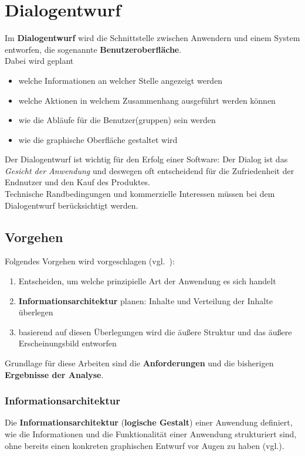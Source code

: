 \section{Dialogentwurf}
Im \textbf{Dialogentwurf} wird die Schnittstelle zwischen Anwendern und einem System entworfen, die sogenannte \textbf{Benutzeroberfläche}.\\

\noindent
Dabei wird geplant

\begin{itemize}
    \item welche Informationen an welcher Stelle angezeigt werden
    \item welche Aktionen in welchem Zusammenhang ausgeführt werden können
    \item wie die Abläufe für die Benutzer(gruppen) sein werden
    \item wie die graphische Oberfläche gestaltet wird
\end{itemize}

\noindent
Der Dialogentwurf ist wichtig für den Erfolg einer Software: Der Dialog ist das \textit{Gesicht der Anwendung} und deswegen oft entscheidend für die Zufriedenheit der Endnutzer und den Kauf des Produktes.\\

\noindent
Technische Randbedingungen und kommerzielle Interessen müssen bei dem Dialogentwurf berücksichtigt werden.


\subsection{Vorgehen}

Folgendes Vorgehen wird vorgeschlagen (vgl.~\cite[29]{Wed09b}):

\begin{enumerate}
    \item Entscheiden, um welche prinzipielle Art der Anwendung es sich handelt
    \item \textbf{Informationsarchitektur} planen: Inhalte und Verteilung der Inhalte überlegen
    \item basierend auf diesen Überlegungen wird die äußere Struktur und das äußere Erscheinungsbild entworfen
\end{enumerate}

\noindent
Grundlage für diese Arbeiten sind die \textbf{Anforderungen} und die bisherigen \textbf{Ergebnisse der Analyse}.

\subsubsection*{Informationsarchitektur}
Die \textbf{Informationsarchitektur} (\textbf{logische Gestalt}) einer Anwendung definiert, wie die Informationen und die Funktionalität einer Anwendung strukturiert sind, ohne bereits einen konkreten graphischen Entwurf vor Augen zu haben (vgl.\cite[30]{Wed09b}).\\

